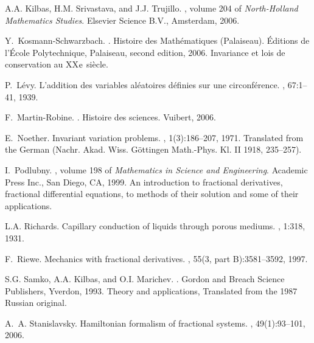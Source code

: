 \documentclass[english,11pt,reqno]{smfart}
\begin{document}
\begin{thebibliography}{10}
A.A. Kilbas, H.M. Srivastava, and J.J. Trujillo.
,
  volume 204 of {\em North-Holland Mathematics Studies}.
\newblock Elsevier Science B.V., Amsterdam, 2006.

Y.~Kosmann-Schwarzbach.
.
\newblock Histoire des Math\'ematiques (Palaiseau). \'Editions de l'\'Ecole
  Polytechnique, Palaiseau, second edition, 2006.
\newblock Invariance et lois de conservation au XX${^{{}}{\rm{e}}}$ si{\`e}cle.

P.~L{\'e}vy.
\newblock L'addition des variables al\'eatoires d\'efinies sur une
  circonf\'erence.
, 67:1--41, 1939.

F.~Martin-Robine.
.
\newblock Histoire des sciences. Vuibert, 2006.

E.~Noether.
\newblock Invariant variation problems.
, 1(3):186--207, 1971.
\newblock Translated from the German (Nachr. Akad. Wiss. G{\"o}ttingen
  Math.-Phys. Kl. II 1918, 235--257).

I.~Podlubny.
, volume 198 of {\em
  Mathematics in Science and Engineering}.
\newblock Academic Press Inc., San Diego, CA, 1999.
\newblock An introduction to fractional derivatives, fractional differential
  equations, to methods of their solution and some of their applications.

L.A. Richards.
\newblock Capillary conduction of liquids through porous mediums.
, 1:318, 1931.

F.~Riewe.
\newblock Mechanics with fractional derivatives.
, 55(3, part B):3581--3592, 1997.

S.G. Samko, A.A. Kilbas, and O.I. Marichev.
.
\newblock Gordon and Breach Science Publishers, Yverdon, 1993.
\newblock Theory and applications, Translated from the 1987 Russian original.

A.~A. Stanislavsky.
\newblock Hamiltonian formalism of fractional systems.
, 49(1):93--101, 2006.


\end{thebibliography}
\end{document}
